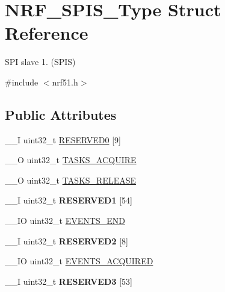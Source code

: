 \hypertarget{struct_n_r_f___s_p_i_s___type}{}\section{N\+R\+F\+\_\+\+S\+P\+I\+S\+\_\+\+Type Struct Reference}
\label{struct_n_r_f___s_p_i_s___type}


S\+P\+I slave 1. (S\+P\+I\+S)  




{\ttfamily \#include $<$nrf51.\+h$>$}

\subsection*{Public Attributes}
\begin{DoxyCompactItemize}
\item 
\+\_\+\+\_\+\+I uint32\+\_\+t \hyperlink{struct_n_r_f___s_p_i_s___type_a765c57e572a2cbd918cafb6691cda04c}{R\+E\+S\+E\+R\+V\+E\+D0} \mbox{[}9\mbox{]}
\item 
\+\_\+\+\_\+\+O uint32\+\_\+t \hyperlink{struct_n_r_f___s_p_i_s___type_ae4331f985581654656ba2f2b104834d7}{T\+A\+S\+K\+S\+\_\+\+A\+C\+Q\+U\+I\+R\+E}
\item 
\+\_\+\+\_\+\+O uint32\+\_\+t \hyperlink{struct_n_r_f___s_p_i_s___type_af5089c3d27b00a74b94e2f550bd088d0}{T\+A\+S\+K\+S\+\_\+\+R\+E\+L\+E\+A\+S\+E}
\item 
\hypertarget{struct_n_r_f___s_p_i_s___type_a5e52fc28c33e9ddfcdf84fc08f539b66}{}\+\_\+\+\_\+\+I uint32\+\_\+t {\bfseries R\+E\+S\+E\+R\+V\+E\+D1} \mbox{[}54\mbox{]}\label{struct_n_r_f___s_p_i_s___type_a5e52fc28c33e9ddfcdf84fc08f539b66}

\item 
\+\_\+\+\_\+\+I\+O uint32\+\_\+t \hyperlink{struct_n_r_f___s_p_i_s___type_a81d3971908cc8420756887b0bc536a59}{E\+V\+E\+N\+T\+S\+\_\+\+E\+N\+D}
\item 
\hypertarget{struct_n_r_f___s_p_i_s___type_a937f282643cf804107025bf9fbc25d5b}{}\+\_\+\+\_\+\+I uint32\+\_\+t {\bfseries R\+E\+S\+E\+R\+V\+E\+D2} \mbox{[}8\mbox{]}\label{struct_n_r_f___s_p_i_s___type_a937f282643cf804107025bf9fbc25d5b}

\item 
\+\_\+\+\_\+\+I\+O uint32\+\_\+t \hyperlink{struct_n_r_f___s_p_i_s___type_ad5d9ce3dceaa11559ececd14ebdc8174}{E\+V\+E\+N\+T\+S\+\_\+\+A\+C\+Q\+U\+I\+R\+E\+D}
\item 
\hypertarget{struct_n_r_f___s_p_i_s___type_a25a168adf916e14e61b2d98530c7df7d}{}\+\_\+\+\_\+\+I uint32\+\_\+t {\bfseries R\+E\+S\+E\+R\+V\+E\+D3} \mbox{[}53\mbox{]}\label{struct_n_r_f___s_p_i_s___type_a25a168adf916e14e61b2d98530c7df7d}


\end{DoxyCompactItemize}
